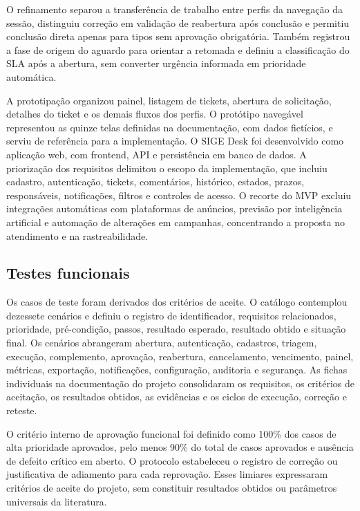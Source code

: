 O refinamento separou a transferência de trabalho entre perfis da navegação da sessão, distinguiu correção em validação de reabertura após conclusão e permitiu conclusão direta apenas para tipos sem aprovação obrigatória. Também registrou a fase de origem do aguardo para orientar a retomada e definiu a classificação do SLA após a abertura, sem converter urgência informada em prioridade automática.

A prototipação organizou painel, listagem de tickets, abertura de solicitação, detalhes do ticket e os demais fluxos dos perfis. O protótipo navegável representou as quinze telas definidas na documentação, com dados fictícios, e serviu de referência para a implementação. O SIGE Desk foi desenvolvido como aplicação web, com frontend, API e persistência em banco de dados. A priorização dos requisitos delimitou o escopo da implementação, que incluiu cadastro, autenticação, tickets, comentários, histórico, estados, prazos, responsáveis, notificações, filtros e controles de acesso. O recorte do MVP excluiu integrações automáticas com plataformas de anúncios, previsão por inteligência artificial e automação de alterações em campanhas, concentrando a proposta no atendimento e na rastreabilidade.

\subsection{\esp Testes funcionais}

Os casos de teste foram derivados dos critérios de aceite. O catálogo contemplou dezessete cenários e definiu o registro de identificador, requisitos relacionados, prioridade, pré-condição, passos, resultado esperado, resultado obtido e situação final. Os cenários abrangeram abertura, autenticação, cadastros, triagem, execução, complemento, aprovação, reabertura, cancelamento, vencimento, painel, métricas, exportação, notificações, configuração, auditoria e segurança. As fichas individuais na documentação do projeto consolidaram os requisitos, os critérios de aceitação, os resultados obtidos, as evidências e os ciclos de execução, correção e reteste.

O critério interno de aprovação funcional foi definido como 100\% dos casos de alta prioridade aprovados, pelo menos 90\% do total de casos aprovados e ausência de defeito crítico em aberto. O protocolo estabeleceu o registro de correção ou justificativa de adiamento para cada reprovação. Esses limiares expressaram critérios de aceite do projeto, sem constituir resultados obtidos ou parâmetros universais da literatura.

